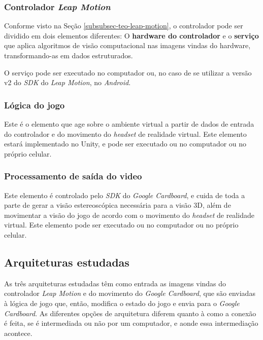 \subsubsection{Controlador \textit{Leap Motion}}\label{subsubsec-elemento-leapmotion}

Conforme visto na Seção \ref{subsubsec-teo-leap-motion}, o controlador pode ser dividido em dois elementos diferentes: O \textbf{hardware do controlador} e o \textbf{serviço} que aplica algoritmos de visão computacional nas imagens vindas do hardware, transformando-as em dados estruturados.

O serviço pode ser executado no computador ou, no caso de se utilizar a versão v2 do \textit{SDK} do \textit{Leap Motion}, no \textit{Android}.

\subsubsection{Lógica do jogo}\label{subsubsec-elemento-logica-jogo}

Este é o elemento que age sobre o ambiente virtual a partir de dados de entrada do controlador e do movimento do \textit{headset} de realidade virtual. Este elemento estará implementado no Unity, e pode ser executado ou no computador ou no próprio celular.

\subsubsection{Processamento de saída do video}\label{subsubsec-elemento-video}

Este elemento é controlado pelo \textit{SDK} do \textit{Google Cardboard}, e cuida de toda a parte de gerar a visão estereoscópica necessária para a visão 3D, além de movimentar a visão do jogo de acordo com o movimento do \textit{headset} de realidade virtual. Este elemento pode ser executado ou no computador ou no próprio celular.

\subsection{Arquiteturas estudadas}\label{subsec-arquiteturas-estudadas}

As três arquiteturas estudadas têm como entrada as imagens vindas do controlador \textit{Leap Motion} e do movimento do \textit{Google Cardboard}, que são enviadas à lógica de jogo que, então, modifica o estado do jogo e envia para o \textit{Google Cardboard}. As diferentes opções de arquitetura diferem quanto à como a conexão é feita, se é intermediada ou não por um computador, e aonde essa intermediação acontece.

